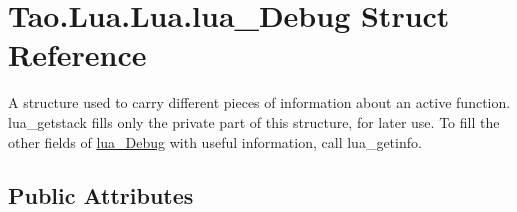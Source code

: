 \hypertarget{struct_tao_1_1_lua_1_1_lua_1_1lua___debug}{
\section{Tao.Lua.Lua.lua\_\-Debug Struct Reference}
\label{struct_tao_1_1_lua_1_1_lua_1_1lua___debug}
}


A structure used to carry different pieces of information about an active function. lua\_\-getstack fills only the private part of this structure, for later use. To fill the other fields of \hyperlink{struct_tao_1_1_lua_1_1_lua_1_1lua___debug}{lua\_\-Debug} with useful information, call lua\_\-getinfo.  


\subsection*{Public Attributes}
